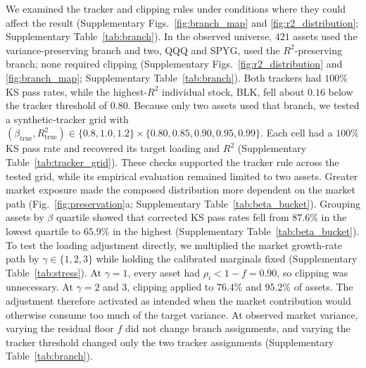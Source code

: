 We examined the tracker and clipping rules under conditions where
they could affect the result (Supplementary Figs.~\ref{fig:branch_map} and
\ref{fig:r2_distribution}; Supplementary Table~\ref{tab:branch}). In the observed universe, $421$ assets
used the variance-preserving branch and two, QQQ and SPYG, used the
$R^2$-preserving branch; none required clipping
(Supplementary Figs.~\ref{fig:r2_distribution} and \ref{fig:branch_map};
Supplementary Table~\ref{tab:branch}). Both trackers had $100\%$ KS pass rates,
while the highest-$R^2$ individual stock, BLK, fell about $0.16$
below the tracker threshold of $0.80$. Because only two assets used
that branch, we tested a synthetic-tracker grid with
$(\beta_{\mathrm{true}},R^2_{\mathrm{true}})\in\{0.8,1.0,1.2\}
\times\{0.80,0.85,0.90,0.95,0.99\}$. Each cell had a $100\%$ KS pass
rate and recovered its target loading and $R^2$
(Supplementary Table~\ref{tab:tracker_grid}). These checks supported the tracker
rule across the tested grid, while its empirical evaluation remained
limited to two assets.
Greater market exposure made the composed distribution more dependent
on the market path (Fig.~\ref{fig:preservation}a;
Supplementary Table~\ref{tab:beta_bucket}). Grouping assets by $\beta$ quartile showed that
corrected KS pass rates fell from $87.6\%$ in the lowest quartile
to $65.9\%$ in the highest (Supplementary Table~\ref{tab:beta_bucket}).
To test the loading adjustment directly, we multiplied the market
growth-rate path by $\gamma\in\{1,2,3\}$ while holding the calibrated
marginals fixed (Supplementary Table~\ref{tab:stress}). At $\gamma=1$, every
asset had $\rho_i<1-f=0.90$, so clipping was unnecessary.
At $\gamma=2$ and $3$, clipping applied to $76.4\%$ and $95.2\%$
of assets. The adjustment therefore activated as intended when the
market contribution would otherwise consume too much of the target
variance. At observed market variance, varying the residual floor
$f$ did not change branch assignments, and varying the tracker
threshold changed only the two tracker assignments
(Supplementary Table~\ref{tab:branch}).
